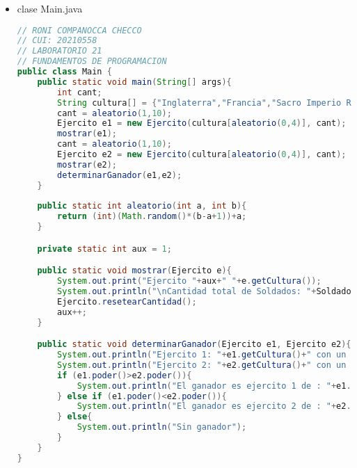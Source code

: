 \documentclass{article}
\begin{document}
\begin{itemize}
\begin{lstlisting}[language=java]
    public static int cuantos(){
        return num;
    }

    public static void resetearCantidad(){
        num=0;
    }

    public int getVida(){
        return nivelVida;
    }

    public String getActitud(){
        return actitud;
    }

    public void setNivelDefensa(int nivelDefensa) {
        this.nivelDefensa = nivelDefensa;
    }

    public int getNivelDefensa(){
        return nivelDefensa;
    }
}
        \end{lstlisting}

        \item clase Main.java
        \begin{lstlisting}[language=java]
// RONI COMPANOCCA CHECCO
// CUI: 20210558
// LABORATORIO 21
// FUNDAMENTOS DE PROGRAMACION 
public class Main {
    public static void main(String[] args){
        int cant;
        String cultura[] = {"Inglaterra","Francia","Sacro Imperio Romano Germanico","Aragon","Moros"};
        cant = aleatorio(1,10);
        Ejercito e1 = new Ejercito(cultura[aleatorio(0,4)], cant);
        mostrar(e1);
        cant = aleatorio(1,10);
        Ejercito e2 = new Ejercito(cultura[aleatorio(0,4)], cant);
        mostrar(e2);
        determinarGanador(e1,e2);
    }
    
    public static int aleatorio(int a, int b){
        return (int)(Math.random()*(b-a+1))+a;
    }

    private static int aux = 1;

    public static void mostrar(Ejercito e){
        System.out.print("Ejercito "+aux+" "+e.getCultura());
        System.out.println("\nCantidad total de Soldados: "+Soldado.cuantos()+"\n"+"Espadachines: "+Espadachin.cuantos()+"\n"+"Arqueros: "+Arquero.cuantos()+"\n"+"Lanceros: "+Lancero.cuantos()+"\n"+"Caballeros: "+Caballero.cuantos()+"\n");
        Ejercito.resetearCantidad();
        aux++;
    }

    public static void determinarGanador(Ejercito e1, Ejercito e2){
        System.out.println("Ejercito 1: "+e1.getCultura()+" con un poder de "+e1.poder());
        System.out.println("Ejercito 2: "+e2.getCultura()+" con un poder de "+e2.poder());
        if (e1.poder()>e2.poder()){
            System.out.println("El ganador es ejercito 1 de : "+e1.getCultura());
        } else if (e1.poder()<e2.poder()){
            System.out.println("El ganador es ejercito 2 de : "+e2.getCultura());
        } else{
            System.out.println("Sin ganador");
        }
    }
}


\end{lstlisting}
\end{itemize}
\end{document}
